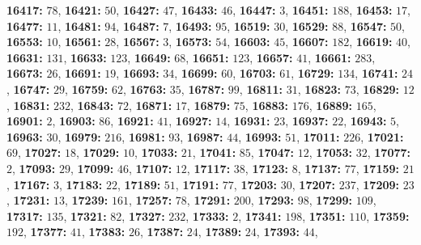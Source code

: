 \textsf{\bfseries 16417:} $78$, \textsf{\bfseries 16421:} $50$, \textsf{\bfseries 16427:} $47$, \textsf{\bfseries 16433:} $46$, \textsf{\bfseries 16447:} $3$, \textsf{\bfseries 16451:} $188$, \textsf{\bfseries 16453:} $17$, \textsf{\bfseries 16477:} $11$, \textsf{\bfseries 16481:} $94$, \textsf{\bfseries 16487:} $7$, \textsf{\bfseries 16493:} $95$, \textsf{\bfseries 16519:} $30$, \textsf{\bfseries 16529:} $88$, \textsf{\bfseries 16547:} $50$, \textsf{\bfseries 16553:} $10$, \textsf{\bfseries 16561:} $28$, \textsf{\bfseries 16567:} $3$, \textsf{\bfseries 16573:} $54$, \textsf{\bfseries 16603:} $45$, \textsf{\bfseries 16607:} $182$, \textsf{\bfseries 16619:} $40$, \textsf{\bfseries 16631:} $131$, \textsf{\bfseries 16633:} $123$, \textsf{\bfseries 16649:} $68$, \textsf{\bfseries 16651:} $123$, \textsf{\bfseries 16657:} $41$, \textsf{\bfseries 16661:} $283$, \textsf{\bfseries 16673:} $26$, \textsf{\bfseries 16691:} $19$, \textsf{\bfseries 16693:} $34$, \textsf{\bfseries 16699:} $60$, \textsf{\bfseries 16703:} $61$, \textsf{\bfseries 16729:} $134$, \textsf{\bfseries 16741:} $24$, \textsf{\bfseries 16747:} $29$, \textsf{\bfseries 16759:} $62$, \textsf{\bfseries 16763:} $35$, \textsf{\bfseries 16787:} $99$, \textsf{\bfseries 16811:} $31$, \textsf{\bfseries 16823:} $73$, \textsf{\bfseries 16829:} $12$, \textsf{\bfseries 16831:} $232$, \textsf{\bfseries 16843:} $72$, \textsf{\bfseries 16871:} $17$, \textsf{\bfseries 16879:} $75$, \textsf{\bfseries 16883:} $176$, \textsf{\bfseries 16889:} $165$, \textsf{\bfseries 16901:} $2$, \textsf{\bfseries 16903:} $86$, \textsf{\bfseries 16921:} $41$, \textsf{\bfseries 16927:} $14$, \textsf{\bfseries 16931:} $23$, \textsf{\bfseries 16937:} $22$, \textsf{\bfseries 16943:} $5$, \textsf{\bfseries 16963:} $30$, \textsf{\bfseries 16979:} $216$, \textsf{\bfseries 16981:} $93$, \textsf{\bfseries 16987:} $44$, \textsf{\bfseries 16993:} $51$, \textsf{\bfseries 17011:} $226$, \textsf{\bfseries 17021:} $69$, \textsf{\bfseries 17027:} $18$, \textsf{\bfseries 17029:} $10$, \textsf{\bfseries 17033:} $21$, \textsf{\bfseries 17041:} $85$, \textsf{\bfseries 17047:} $12$, \textsf{\bfseries 17053:} $32$, \textsf{\bfseries 17077:} $2$, \textsf{\bfseries 17093:} $29$, \textsf{\bfseries 17099:} $46$, \textsf{\bfseries 17107:} $12$, \textsf{\bfseries 17117:} $38$, \textsf{\bfseries 17123:} $8$, \textsf{\bfseries 17137:} $77$, \textsf{\bfseries 17159:} $21$, \textsf{\bfseries 17167:} $3$, \textsf{\bfseries 17183:} $22$, \textsf{\bfseries 17189:} $51$, \textsf{\bfseries 17191:} $77$, \textsf{\bfseries 17203:} $30$, \textsf{\bfseries 17207:} $237$, \textsf{\bfseries 17209:} $23$, \textsf{\bfseries 17231:} $13$, \textsf{\bfseries 17239:} $161$, \textsf{\bfseries 17257:} $78$, \textsf{\bfseries 17291:} $200$, \textsf{\bfseries 17293:} $98$, \textsf{\bfseries 17299:} $109$, \textsf{\bfseries 17317:} $135$, \textsf{\bfseries 17321:} $82$, \textsf{\bfseries 17327:} $232$, \textsf{\bfseries 17333:} $2$, \textsf{\bfseries 17341:} $198$, \textsf{\bfseries 17351:} $110$, \textsf{\bfseries 17359:} $192$, \textsf{\bfseries 17377:} $41$, \textsf{\bfseries 17383:} $26$, \textsf{\bfseries 17387:} $24$, \textsf{\bfseries 17389:} $24$, \textsf{\bfseries 17393:} $44$, 
